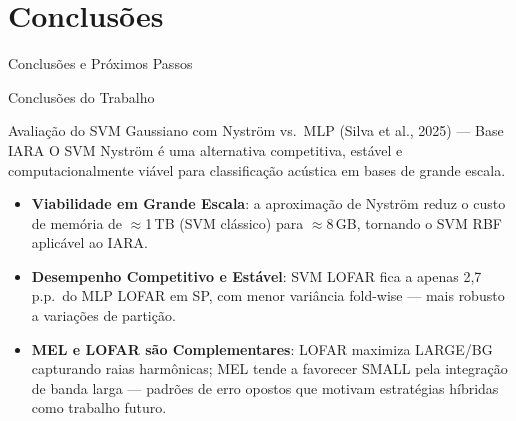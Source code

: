 \documentclass{beamer}
\begin{document}
\section{Conclusões}
\begin{frame}
    \centering
    \huge Conclusões e Próximos Passos
    \label{sec:concl}
\end{frame}

\begin{frame}{Conclusões do Trabalho}
    \small
    \begin{block}{\small Avaliação do SVM Gaussiano com Nyström vs.\ MLP (Silva et al., 2025) — Base IARA}
        \scriptsize
        O SVM Nyström é uma alternativa competitiva, estável e computacionalmente viável para classificação acústica em bases de grande escala.
    \end{block}

    \vspace{0.1cm}
    \begin{itemize}
        \setlength{\itemsep}{5pt}
        \item \textbf{Viabilidade em Grande Escala}: a aproximação de Nyström reduz o custo de memória de $\approx$1\,TB (SVM clássico) para $\approx$8\,GB, tornando o SVM RBF aplicável ao IARA.
        \item \textbf{Desempenho Competitivo e Estável}: SVM LOFAR fica a apenas 2,7\,p.p.\ do MLP LOFAR em SP, com menor variância fold-wise — mais robusto a variações de partição.
        \item \textbf{MEL e LOFAR são Complementares}: LOFAR maximiza LARGE/BG capturando raias harmônicas; MEL tende a favorecer SMALL pela integração de banda larga — padrões de erro opostos que motivam estratégias híbridas como trabalho futuro.
    \end{itemize}
\end{frame}
\end{document}
